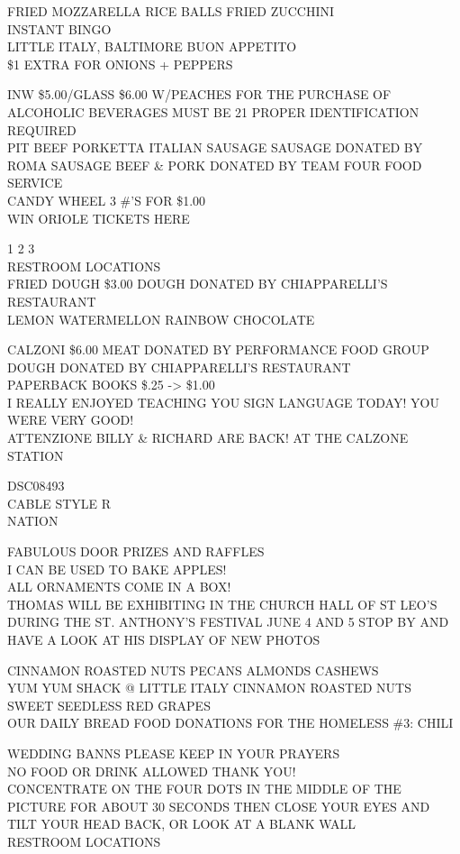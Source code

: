 \documentclass[10pt,letterpaper]{article}
\begin{document}
FRIED MOZZARELLA RICE BALLS FRIED ZUCCHINI\\
INSTANT BINGO\\
LITTLE ITALY, BALTIMORE BUON APPETITO\\
\$1 EXTRA FOR ONIONS + PEPPERS

INW \$5.00/GLASS \$6.00 W/PEACHES FOR THE PURCHASE OF ALCOHOLIC BEVERAGES MUST BE 21 PROPER IDENTIFICATION REQUIRED\\
PIT BEEF PORKETTA ITALIAN SAUSAGE SAUSAGE DONATED BY ROMA SAUSAGE BEEF \& PORK DONATED BY TEAM FOUR FOOD SERVICE\\
CANDY WHEEL 3 \#'S FOR \$1.00\\
WIN ORIOLE TICKETS HERE

1 2 3\\
RESTROOM LOCATIONS\\
FRIED DOUGH \$3.00 DOUGH DONATED BY CHIAPPARELLI'S RESTAURANT\\
LEMON WATERMELLON RAINBOW CHOCOLATE

CALZONI \$6.00 MEAT DONATED BY PERFORMANCE FOOD GROUP DOUGH DONATED BY CHIAPPARELLI'S RESTAURANT\\
PAPERBACK BOOKS \$.25 {-}> \$1.00\\
I REALLY ENJOYED TEACHING YOU SIGN LANGUAGE TODAY!  YOU WERE VERY GOOD!\\
ATTENZIONE BILLY \& RICHARD ARE BACK! AT THE CALZONE STATION

DSC08493\\
CABLE STYLE R\\
NATION

FABULOUS DOOR PRIZES AND RAFFLES\\
I CAN BE USED TO BAKE APPLES!\\
ALL ORNAMENTS COME IN A BOX!\\
THOMAS WILL BE EXHIBITING IN THE CHURCH HALL OF ST LEO'S DURING THE ST. ANTHONY'S FESTIVAL JUNE 4 AND 5 STOP BY AND HAVE A LOOK AT HIS DISPLAY OF NEW PHOTOS

CINNAMON ROASTED NUTS PECANS ALMONDS CASHEWS\\
YUM YUM SHACK @ LITTLE ITALY CINNAMON ROASTED NUTS\\
SWEET SEEDLESS RED GRAPES\\
OUR DAILY BREAD FOOD DONATIONS FOR THE HOMELESS \#3: CHILI

WEDDING BANNS PLEASE KEEP IN YOUR PRAYERS\\
NO FOOD OR DRINK ALLOWED THANK YOU!\\
CONCENTRATE ON THE FOUR DOTS IN THE MIDDLE OF THE PICTURE FOR ABOUT 30 SECONDS THEN CLOSE YOUR EYES AND TILT YOUR HEAD BACK, OR LOOK AT A BLANK WALL\\
RESTROOM LOCATIONS
\end{document}
